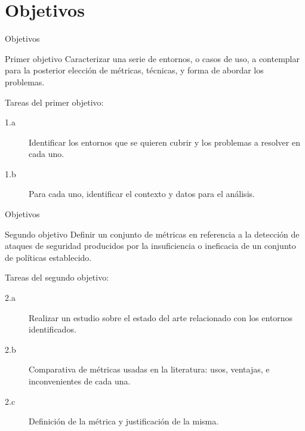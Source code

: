 \documentclass{beamer}
\begin{document}
\section{Objetivos}

\begin{frame}{Objetivos}

\begin{block}{Primer objetivo}
Caracterizar una serie de entornos, o casos de uso, a contemplar para la posterior elección de métricas, técnicas, y forma de abordar los problemas.
\end{block}

Tareas del primer objetivo:

\begin{description}
  \item[1.a] Identificar los entornos que se quieren cubrir y los problemas a resolver en cada uno.
  \item[1.b] Para cada uno, identificar el contexto y datos para el análisis.
\end{description}

\end{frame}

\begin{frame}{Objetivos}

\begin{block}{Segundo objetivo}
Definir un conjunto de métricas en referencia a la detección de ataques de seguridad producidos por la insuficiencia o ineficacia de un conjunto de políticas establecido.
\end{block}

Tareas del segundo objetivo:

\begin{description}
  \item[2.a] Realizar un estudio sobre el estado del arte
    relacionado con los entornos identificados. 
  \item[2.b] Comparativa de métricas usadas en la literatura: usos, ventajas, e inconvenientes de cada una.
  \item[2.c] Definición de la métrica y justificación de la misma.
\end{description}

\end{frame}
\end{document}
